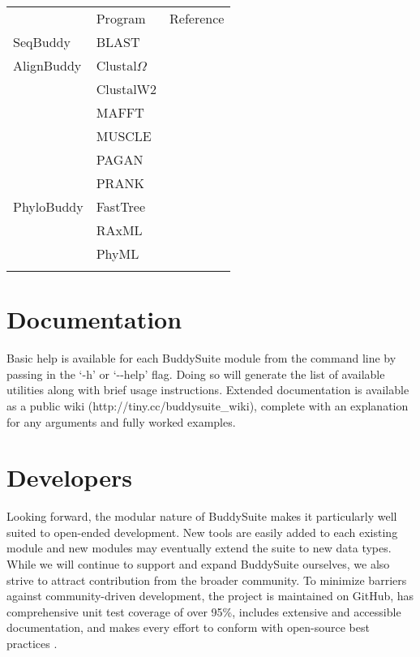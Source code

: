 \documentclass[nogrid]{MBE_article}%
\begin{document}
\begin{table}[!t]
      {\tabcolsep=5pt\begin{tabular}{@{\extracolsep{\fill}}lll@{}}
      \toprule
	   						& Program								& Reference
      \\\colrule
      SeqBuddy				& BLAST 								& \cite{Camacho2009}
      \\\colrule
      AlignBuddy			& Clustal$\Omega$						& \cite{Sievers:2011fn} \\
        					& ClustalW2 							& \cite{Larkin:2007hz} \\
							& MAFFT 								& \cite{Katoh:2013hm} \\
							& MUSCLE 								& \cite{Edgar:2004bo} \\
							& PAGAN 								& \cite{Loytynoja:2012fy} \\
        					& PRANK 								& \cite{Loytynoja:2005cb}		
      \\\colrule
      PhyloBuddy			& FastTree								& \cite{Price:2010eg} \\
        					& RAxML 								& \cite{Stamatakis:2006de} \\
        					& PhyML 								& \cite{Guindon:2010gf}
      \\\botrule
      \end{tabular}}
{}
\end{table}

\section{Documentation}
Basic help is available for each BuddySuite module from the command line by passing in the `-h' or `-{}-help' flag. Doing so will generate the list of available utilities along with brief usage instructions. Extended documentation is available as a public wiki (http://tiny.cc/buddysuite\_wiki), complete with an explanation for any arguments and fully worked examples.

\section{Developers}
Looking forward, the modular nature of BuddySuite makes it particularly well suited to open-ended development. New tools are easily added to each existing module and new modules may eventually extend the suite to new data types. While we will continue to support and expand BuddySuite ourselves, we also strive to attract contribution from the broader community. To minimize barriers against community-driven development, the project is maintained on GitHub, has comprehensive unit test coverage of over 95\%, includes extensive and accessible documentation, and makes every effort to conform with open-source best practices \cite{Leprevost:2014gx,Seemann:2013ci}.
\end{document}
